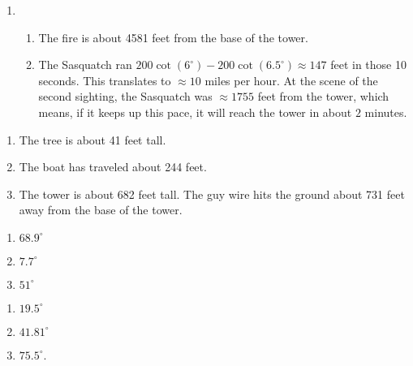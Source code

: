 \begin{enumerate}

\setcounter{enumi}{\value{HW}}

\item \begin{enumerate}

\addtocounter{enumii}{1}

\item The fire is about 4581 feet from the base of the tower.

\item  The Sasquatch ran $200\cot(6^{\circ}) - 200\cot(6.5^{\circ}) \approx 147$ feet in those 10 seconds. This translates to $\approx 10$ miles per hour.  At the scene of the second sighting, the Sasquatch was $\approx 1755$ feet from the tower, which means, if it keeps up this pace, it will reach the tower in about $2$ minutes.

\end{enumerate}

\setcounter{HW}{\value{enumi}}

\end{enumerate}

\begin{enumerate}

\setcounter{enumi}{\value{HW}}

\item  The tree is about 41 feet tall.

\item The boat has traveled about 244 feet.

\item  The tower is about 682 feet tall. The guy wire hits the ground about  731 feet away from the base of the tower.

\setcounter{HW}{\value{enumi}}

\end{enumerate}

\begin{multicols}{3}

\begin{enumerate}

\setcounter{enumi}{\value{HW}}

\item $68.9^{\circ}$

\item $7.7^{\circ}$

\item $51^{\circ}$

\setcounter{HW}{\value{enumi}}

\end{enumerate}

\end{multicols}

\begin{multicols}{3}

\begin{enumerate}

\setcounter{enumi}{\value{HW}}

\item $19.5^{\circ}$

\item  $41.81^{\circ}$

\item  $75.5^{\circ}$.

\setcounter{HW}{\value{enumi}}

\end{enumerate}

\end{multicols}